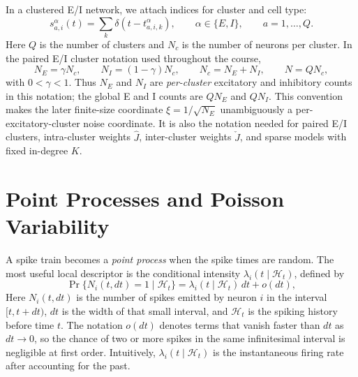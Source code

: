 In a clustered E/I network, we attach indices for cluster and cell type:
%
\begin{equation}
  s_{a,i}^{\alpha}(t)
  =
  \sum_k \delta\!\left(t-t_{a,i,k}^{\alpha}\right),
  \qquad
  \alpha\in\{E,I\},
  \qquad
  a=1,\ldots,Q.
  \label{eq:clustered-spike-train}
\end{equation}
%
Here $Q$ is the number of clusters and $N_c$ is the number of neurons per cluster. In the paired E/I cluster notation used throughout the course,
%
\begin{equation}
  N_E=\gamma N_c,
  \qquad
  N_I=(1-\gamma)N_c,
  \qquad
  N_c=N_E+N_I,
  \qquad
  N=Q N_c,
  \label{eq:cluster-size-relations}
\end{equation}
%
with $0<\gamma<1$. Thus $N_E$ and $N_I$ are \emph{per-cluster} excitatory and inhibitory counts in this notation; the global E and I counts are $Q N_E$ and $Q N_I$. This convention makes the later finite-size coordinate $\xi=1/\sqrt{N_E}$ unambiguously a per-excitatory-cluster noise coordinate. It is also the notation needed for paired E/I clusters, intra-cluster weights $\hat{J}$, inter-cluster weights $\check{J}$, and sparse models with fixed in-degree $K$.

\section{Point Processes and Poisson Variability}
\label{sec:point-processes-poisson}

A spike train becomes a \emph{point process} when the spike times are random. The most useful local descriptor is the conditional intensity $\lambda_i(t\mid\mathcal{H}_t)$, defined by
%
\begin{equation}
  \Pr\{N_i(t,dt)=1\mid\mathcal{H}_t\}
  =
  \lambda_i(t\mid\mathcal{H}_t)\,dt + o(dt),
  \label{eq:conditional-intensity}
\end{equation}
%
Here $N_i(t,dt)$ is the number of spikes emitted by neuron $i$ in the interval $[t,t+dt)$, $dt$ is the width of that small interval, and $\mathcal{H}_t$ is the spiking history before time $t$. The notation $o(dt)$ denotes terms that vanish faster than $dt$ as $dt\to 0$, so the chance of two or more spikes in the same infinitesimal interval is negligible at first order. Intuitively, $\lambda_i(t\mid\mathcal{H}_t)$ is the instantaneous firing rate after accounting for the past.

